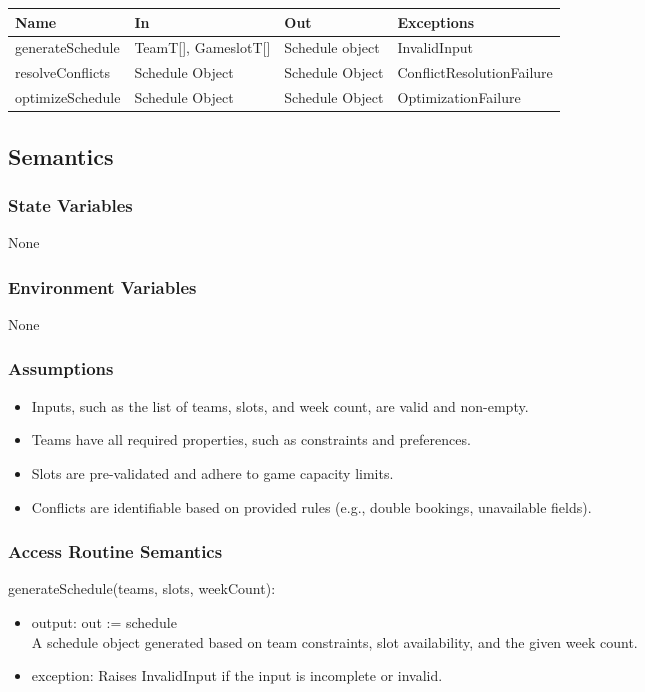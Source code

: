 \documentclass[12pt, titlepage]{article}
\begin{document}
\begin{center}
  \begin{tabular}{|p{3cm}|p{3.5cm}|p{3.5cm}|p{5cm}|}
  \hline
  Name & In & Out & Exceptions \\
  \hline
  generateSchedule & TeamT[], GameslotT[] & Schedule object & InvalidInput \\
  resolveConflicts & Schedule Object & Schedule Object & ConflictResolutionFailure \\
  optimizeSchedule & Schedule Object & Schedule Object & OptimizationFailure \\
  \hline
  \end{tabular}
\end{center}

\subsection{Semantics}

\subsubsection{State Variables}
None

\subsubsection{Environment Variables}
None

\subsubsection{Assumptions}
\begin{itemize}
  \item Inputs, such as the list of teams, slots, and week count, are valid and non-empty.
  \item Teams have all required properties, such as constraints and preferences.
  \item Slots are pre-validated and adhere to game capacity limits.
  \item Conflicts are identifiable based on provided rules (e.g., double bookings, unavailable fields).
\end{itemize}

\subsubsection{Access Routine Semantics}

\noindent generateSchedule(teams, slots, weekCount):
\begin{itemize}
  \item output: out := schedule \\ A schedule object generated based on team constraints, slot availability, and the given week count.
  \item exception: Raises InvalidInput if the input is incomplete or invalid.
\end{itemize}
\end{document}
